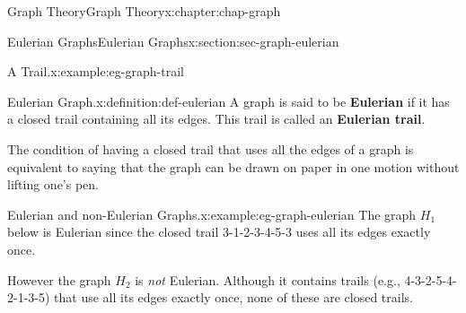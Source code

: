 \documentclass[oneside,10pt,]{book}
\newcommand{\terminology}[1]{\textbf{#1}}
\numberwithin{equation}{section}
\begin{document}
\begin{chapterptx}{Graph Theory}{}{Graph Theory}{}{}{x:chapter:chap-graph}
\begin{sectionptx}{Eulerian Graphs}{}{Eulerian Graphs}{}{}{x:section:sec-graph-eulerian}
\begin{example}{A Trail.}{x:example:eg-graph-trail}
\begin{sidebyside}{1}{0.325}{0.325}{0}
\begin{sbspanel}{0.35}
{
}%
\end{sbspanel}%
\end{sidebyside}%
\end{example}
\begin{definition}{Eulerian Graph.}{x:definition:def-eulerian}%
A graph is said to be \terminology{Eulerian} if it has a closed trail containing all its edges. This trail is called an \terminology{Eulerian trail}.%
\end{definition}
The condition of having a closed trail that uses all the edges of a graph is equivalent to saying that the graph can be drawn on paper in one motion without lifting one's pen.%
\begin{example}{Eulerian and non-Eulerian Graphs.}{x:example:eg-graph-eulerian}%
The graph \(H_1\) below is Eulerian since the closed trail 3-1-2-3-4-5-3 uses all its edges exactly once.%
\par
However the graph \(H_2\) is \emph{not} Eulerian. Although it contains trails (e.g.\@, 4-3-2-5-4-2-1-3-5) that use all its edges exactly once, none of these are closed trails.%
\begin{sidebyside}{2}{0.17}{0.17}{0.23}%
\begin{sbspanel}{0.18}%
\resizebox{\linewidth}{!}{%
			\begin{tikzpicture}[scale=0.4]

\end{tikzpicture}}
\end{sbspanel}
\end{sidebyside}
\end{example}
\end{sectionptx}
\end{chapterptx}
\end{document}
